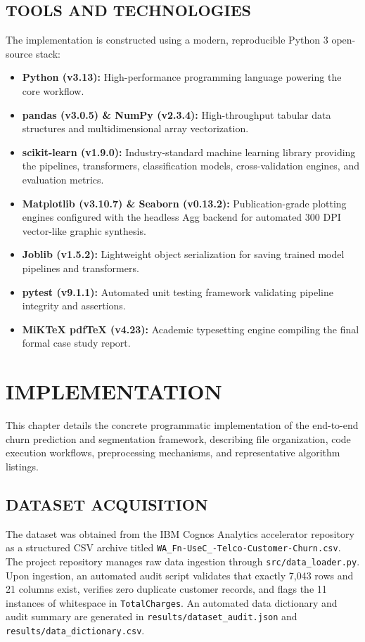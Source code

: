 \documentclass[12pt,a4paper]{report}
\newcommand{\datasetTotalRows}{7,043}
\newcommand{\datasetTotalCols}{21}
\begin{document}
\section{TOOLS AND TECHNOLOGIES}
The implementation is constructed using a modern, reproducible Python 3 open-source stack:
\begin{itemize}
    \item \textbf{Python (v3.13):} High-performance programming language powering the core workflow.
    \item \textbf{pandas (v3.0.5) \& NumPy (v2.3.4):} High-throughput tabular data structures and multidimensional array vectorization.
    \item \textbf{scikit-learn (v1.9.0):} Industry-standard machine learning library providing the pipelines, transformers, classification models, cross-validation engines, and evaluation metrics.
    \item \textbf{Matplotlib (v3.10.7) \& Seaborn (v0.13.2):} Publication-grade plotting engines configured with the headless Agg backend for automated 300 DPI vector-like graphic synthesis.
    \item \textbf{Joblib (v1.5.2):} Lightweight object serialization for saving trained model pipelines and transformers.
    \item \textbf{pytest (v9.1.1):} Automated unit testing framework validating pipeline integrity and assertions.
    \item \textbf{MiKTeX pdfTeX (v4.23):} Academic typesetting engine compiling the final formal case study report.
\end{itemize}

\chapter{IMPLEMENTATION}

This chapter details the concrete programmatic implementation of the end-to-end churn prediction and segmentation framework, describing file organization, code execution workflows, preprocessing mechanisms, and representative algorithm listings.

\section{DATASET ACQUISITION}
The dataset was obtained from the IBM Cognos Analytics accelerator repository as a structured CSV archive titled \texttt{WA\_Fn-UseC\_-Telco-Customer-Churn.csv}. The project repository manages raw data ingestion through \texttt{src/data\_loader.py}. Upon ingestion, an automated audit script validates that exactly \datasetTotalRows{} rows and \datasetTotalCols{} columns exist, verifies zero duplicate customer records, and flags the 11 instances of whitespace in \texttt{TotalCharges}. An automated data dictionary and audit summary are generated in \texttt{results/dataset\_audit.json} and \texttt{results/data\_dictionary.csv}.
\end{document}
